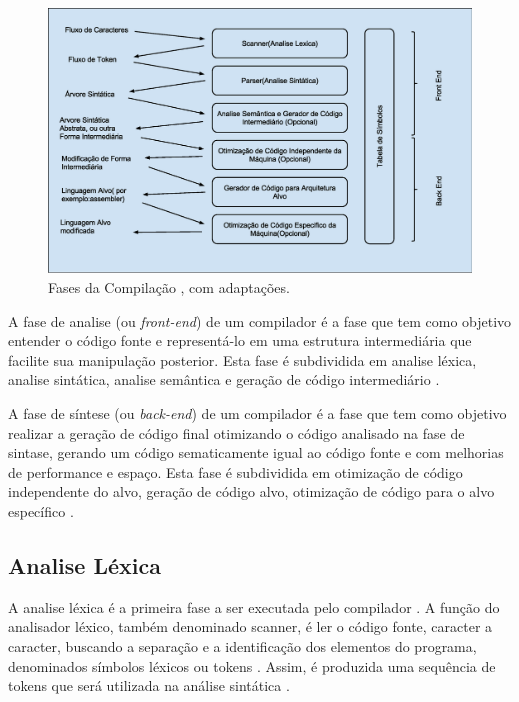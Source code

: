 \begin{figure}[h]
    \centering
        \includegraphics[keepaspectratio=true,scale=0.45]{figuras/fases_da_compilacao.eps}
    \caption{Fases da Compilação \cite{ref6}, com adaptações.}
    \label{fig01}
\end{figure}

A fase de analise (ou \textit{front-end}) de um compilador é a fase que 
tem como objetivo entender o código fonte e  representá-lo em uma 
estrutura intermediária que facilite sua manipulação posterior. 
Esta fase é subdividida em analise léxica, analise sintática, 
analise semântica e geração de código intermediário \cite{ref14}.

A fase de síntese (ou \textit{back-end}) de um compilador é a fase que tem 
como objetivo realizar a geração de código final otimizando o código 
analisado na fase de sintase, gerando um código sematicamente igual ao 
código fonte e com melhorias de performance e espaço. Esta fase é 
subdividida em otimização de código independente do alvo, geração de 
código alvo, otimização de código  para o alvo específico \cite{ref14}.


\subsection{Analise Léxica}
    
A analise léxica é a primeira fase a ser executada pelo compilador \cite{ref15}. 
A função do analisador léxico, também denominado scanner, é ler o código fonte, 
caracter a caracter, buscando a separação e  a identificação dos elementos do 
programa, denominados símbolos léxicos ou tokens \cite{ref16}. Assim, é 
produzida uma sequência de tokens que será utilizada na análise sintática \cite{ref17}. 

